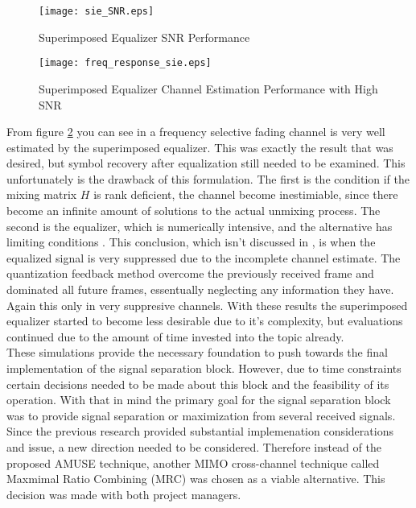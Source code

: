 \begin{figure}[!ht]\label{sie}
\centering
\texttt{[image: sie\_SNR.eps]}
\caption{Superimposed Equalizer SNR Performance}
\end{figure}

\begin{figure}[!ht]\label{sie_freq}
\centering
\texttt{[image: freq\_response\_sie.eps]}
\caption{Superimposed Equalizer Channel Estimation Performance with High SNR}
\end{figure}

%

From figure \ref{sie_freq} you can see in a frequency selective fading channel is very well estimated by the superimposed equalizer.  This was exactly the result that was desired, but symbol recovery after equalization still needed to be examined. This unfortunately is the drawback of this formulation.  The first is the condition if the mixing matrix \(H\) is rank deficient, the channel become inestimiable,  since there become an infinite amount of solutions to the actual unmixing process.  The second is the equalizer, which is numerically intensive, and the alternative has limiting conditions \cite{Ghogho}.  This conclusion, which isn't discussed in \cite{Ghogho}, is when the equalized signal is very suppressed due to the incomplete channel estimate.  The quantization feedback method overcome the previously received frame and dominated all future frames, essentually neglecting any information they have.  Again this only in very suppresive channels.  With these results the superimposed equalizer started to become less desirable due to it's complexity, but evaluations continued due to the amount of time invested into the topic already.\\




These simulations provide the necessary foundation to push towards the final implementation of the signal separation block.  However, due to time constraints certain decisions needed to be made about this block and the feasibility of its operation.  With that in mind the primary goal for the signal separation block was to provide signal separation or maximization from several received signals.  Since the previous research provided substantial implemenation considerations and issue, a new direction needed to be considered.  Therefore instead of the proposed AMUSE\cite{AMUSE} technique, another MIMO cross-channel technique called Maxmimal Ratio Combining (MRC) was chosen as a viable alternative.  This decision was made with both project managers.\\

